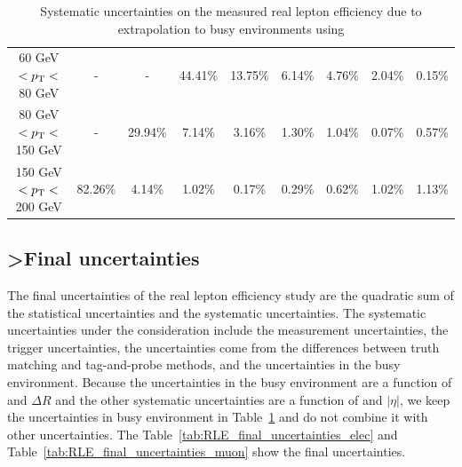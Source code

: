 \begin{center}
\begin{table}
{\begin{tabular}{ccccccccc}
60 GeV $< p_{\text T} <$ 80 GeV & - & - & 44.41\% & 13.75\% & 6.14\% & 4.76\% & 2.04\% & 0.15\%\\
80 GeV $< p_{\text T} <$ 150 GeV & - & 29.94\% & 7.14\% & 3.16\% & 1.30\% & 1.04\% & 0.07\% & 0.57\%\\
150 GeV $< p_{\text T} <$ 200 GeV & 82.26\% & 4.14\% & 1.02\% & 0.17\% & 0.29\% & 0.62\% & 1.02\% & 1.13\%\\
\hline
\hline
\end{tabular}
}
\caption{
Systematic uncertainties on the measured real lepton efficiency due to extrapolation to busy environments using 
}
\label{tab:RLE_syst_busy}
\end{table}
\end{center}



\subsection{>Final uncertainties}
\label{subsubsec:RLE_final_uncertainties}

The final uncertainties of the real lepton efficiency study are the quadratic sum of the statistical uncertainties and the systematic uncertainties.
The systematic uncertainties under the consideration include the measurement uncertainties, the trigger uncertainties, the uncertainties come from the differences between truth matching and tag-and-probe methods, and the uncertainties in the busy environment.
Because the uncertainties in the busy environment are a function of \pT and $\Delta R$ and the other systematic uncertainties are a function of \pT and $|\eta|$, we keep the uncertainties in busy environment in Table~\ref{tab:RLE_syst_busy} and do not combine it with other uncertainties.
The Table~\ref{tab:RLE_final_uncertainties_elec} and Table~\ref{tab:RLE_final_uncertainties_muon} show the final uncertainties.

